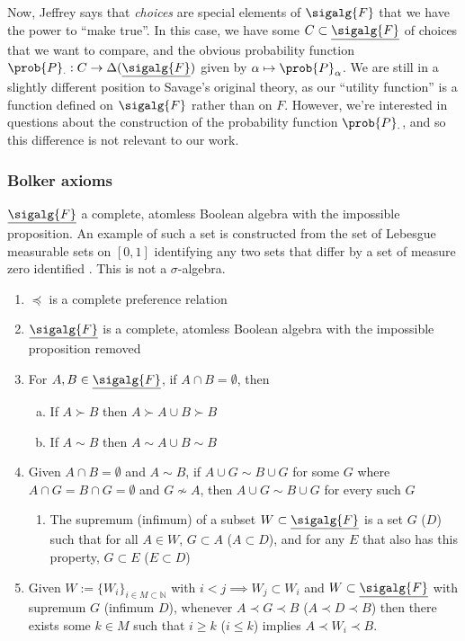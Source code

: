 Now, Jeffrey says that \emph{choices} are special elements of $\sigalg{F}$ that we have the power to ``make true''. In this case, we have some $C\subset\underline{\sigalg{F}}$ of choices that we want to compare, and the obvious probability function $\prob{P}_\cdot: C\to \Delta(\underline{\sigalg{F}})$ given by $\alpha\mapsto \prob{P}_\alpha$. We are still in a slightly different position to Savage's original theory, as our ``utility function'' is a function defined on $\sigalg{F}$ rather than on $F$. However, we're interested in questions about the construction of the probability function $\prob{P}_\cdot$, and so this difference is not relevant to our work.

\subsubsection{Bolker axioms}

$\underline{\sigalg{F}}$ a complete, atomless Boolean algebra with the impossible proposition. An example of such a set is constructed from the set of Lebesgue measurable sets on $[0,1]$ identifying any two sets that differ by a set of measure zero identified \citet{bolker_simultaneous_1967}. This is not a $\sigma$-algebra.
 
\begin{enumerate}[A1:]
    \item $\preceq$ is a complete preference relation
    \item $\underline{\sigalg{F}}$ is a complete, atomless Boolean algebra with the impossible proposition removed
    \item For $A,B\in \underline{\sigalg{F}}$, if $A\cap B=\emptyset$, then
    \begin{enumerate}[a)]
        \item If $A\succ B$ then $A\succ A\cup B \succ B$
        \item If $A\sim B$ then $A\sim A\cup B \sim B$
    \end{enumerate}
    \item Given $A\cap B=\emptyset$ and $A\sim B$, if $A\cup G\sim B\cup G$ for some $G$ where $A\cap G=B\cap G=\emptyset$ and $G\not\sim A$, then $A\cup G\sim B\cup G$ for every such $G$
    \begin{enumerate}[D1:]
        \item The supremum (infimum) of a subset $W\subset \underline{\sigalg{F}}$ is a set $G$ ($D$) such that for all $A\in W$, $G\subset A$ ($A\subset D$), and for any $E$ that also has this property, $G\subset E$ ($E\subset D$)
    \end{enumerate}
    \item Given $W:= \{W_i\}_{i\in M\subset \mathbb{N}}$ with $i<j\implies W_j\subset W_i$ and $W\subset \underline{\sigalg{F}}$ with supremum $G$ (infimum $D$), whenever $A\prec G \prec B$ ($A\prec D\prec B$) then there exists some $k\in M$ such that $i\geq k$ ($i\leq k$) implies $A\prec W_i \prec B$.
\end{enumerate}

